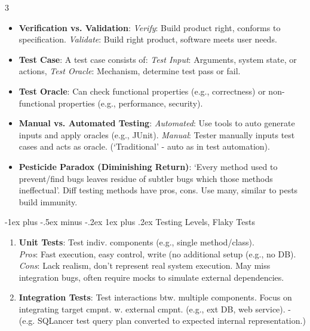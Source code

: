 \documentclass[a4paper, 10pt, landscape]{article}
\makeatletter
\renewcommand{\subsubsection}{\@startsection{subsubsection}{3}{0mm}%
                                {-1ex plus -.5ex minus -.2ex}%
                                {1ex plus .2ex}%
                                {\normalfont\small\bfseries}}
\makeatother
\begin{document}
\begin{multicols*}{3}
\begin{itemize}
	\item \textbf{Verification vs. Validation}: 
		\textit{Verify}: Build product right, conforms to specification. 
	       \textit{Validate}: Build right product, software meets user needs.
	\item \textbf{Test Case}: A test case consists of: 
		\textit{Test Input}: Arguments, system state, or actions, \textit{Test Oracle}: Mechanism, determine test pass or fail.
    \item \textbf{Test Oracle}: Can check functional properties (e.g., correctness) or non-functional properties (e.g., performance, security).
    \item \textbf{Manual vs. Automated Testing}: \textit{Automated}: Use tools to auto generate inputs and apply oracles (e.g., JUnit). \textit{Manual}: Tester manually inputs test cases and acts as oracle. (`Traditional' -  auto as in test automation).
    \item \textbf{Pesticide Paradox (Diminishing Return)}: `Every method used to prevent/find bugs leaves residue of subtler bugs which those methods ineffectual'. Diff testing methods have pros, cons. Use many, similar to pests build immunity.
    \end{itemize}

\subsubsection{Testing Levels, Flaky Tests}
\begin{enumerate}[leftmargin=2mm,labelindent=1mm,labelsep=1mm, itemsep = 0.5pt, before=\justifying]
    \item \textbf{Unit Tests}: Test indiv. components (e.g., single method/class). \\
    	\textit{Pros}: Fast execution, easy control, write (no additional setup (e.g., no DB). \\
    	\textit{Cons}: Lack realism, don’t represent real system execution. May miss integration bugs, often require mocks to simulate external dependencies.

    \item \textbf{Integration Tests}: Test interactions btw. multiple components. Focus on integrating target cmpnt. w. external cmpnt. (e.g., ext DB, web service). - (e.g. SQLancer test query plan converted to expected internal representation.)


\end{enumerate}
\end{multicols*}
\end{document}
